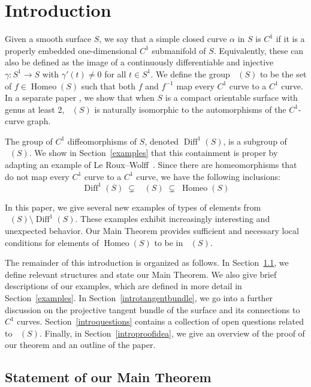 \documentclass[sn-mathphys-num]{sn-jnl}%
\theoremstyle{thmstyleone}%
\theoremstyle{thmstyletwo}%
\theoremstyle{thmstylethree}%
\DeclareMathOperator{\homeo}{Homeo}
\DeclareMathOperator{\diff}{Diff}
\DeclareMathOperator{\thomeo}{Homeo^{1}}
\begin{document}
\section{Introduction}\label{intro}

Given a smooth surface $S$,  we say that a simple closed curve $\alpha$ in $S$ is $C^1$ if it is a properly embedded one-dimensional $C^1$ submanifold of $S$. Equivalently,  these can also be defined as the image of a continuously differentiable and injective $\gamma: S^1 \rightarrow S$ with $\gamma'(t) \neq 0$ for all $t \in S^1$.  We define the group $\thomeo(S)$ to be the set of $f\in\homeo(S)$ such that both  $f$ and $f^{-1}$ map every $C^1$ curve to a $C^1$ curve.   In a separate paper \cite{BoothAutck}, we show that when $S$ is a compact orientable surface with genus at least 2,  $\thomeo(S)$ is naturally isomorphic to the automorphisms of the $C^1$-curve graph. 

The group of $C^1$ diffeomorphisms of $S$,  denoted $\diff^1(S)$,  is a subgroup of $\thomeo(S)$.  We show in Section~\ref{examples} that this containment is proper by adapting an example of Le Roux--Wolff~\cite{LRW}.  
Since there are homeomorphisms that do not map every $C^1$ curve to a $C^1$ curve, we have the following inclusions:
$$\diff^1(S)\; \subsetneq \;  \thomeo(S) \;  \subsetneq \; \homeo(S)$$ 

In this paper, 
we give several new examples of types of elements from $\thomeo(S) {\setminus} \diff^1(S)$. These examples exhibit increasingly interesting and unexpected behavior.  Our Main Theorem provides sufficient and necessary local conditions for elements of $\homeo(S)$ to be in $\thomeo(S)$.  


The remainder of this introduction is organized as follows.  In Section~\ref{intromainthm}, we define relevant structures and state our Main Theorem.  We also give brief descriptions of our examples,  which are defined in more detail in Section~\ref{examples}.   In Section~\ref{introtangentbundle},  we go into a further discussion on the projective tangent bundle of the surface and its connections to $C^1$ curves.  Section~\ref{introquestions} contains a collection of open questions related to $\thomeo(S)$.  Finally, in Section~\ref{introproofidea},  we give an overview of the proof of our theorem and an outline of the paper.  

\subsection{Statement of our Main Theorem}\label{intromainthm}
\end{document}
